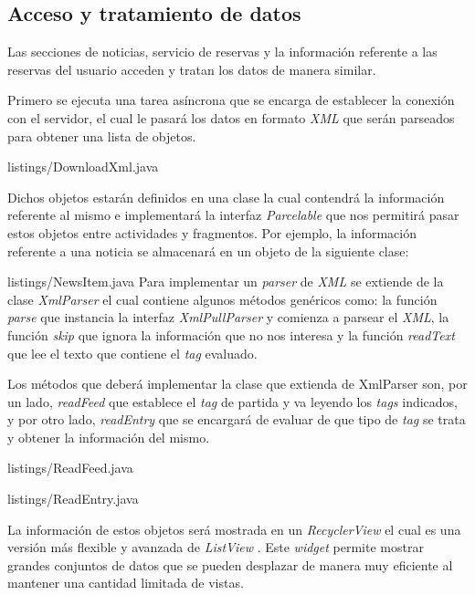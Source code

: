 \subsection{Acceso y tratamiento de datos}

Las secciones de noticias, servicio de reservas y la información referente a las reservas del usuario acceden y tratan los datos de manera similar. 

Primero se ejecuta una tarea asíncrona que se encarga de establecer la conexión con el servidor, el cual le pasará los datos en formato \textit{XML} que serán parseados para obtener una lista de objetos. 
\newpage

{listings/DownloadXml.java} %

Dichos objetos estarán definidos en una clase la cual contendrá la información referente al mismo e implementará la interfaz \textit{Parcelable} que nos permitirá pasar estos objetos entre actividades y fragmentos. Por ejemplo, la información referente a una noticia se almacenará en un objeto de la siguiente clase:
\newpage

{listings/NewsItem.java} %
\newpage
Para implementar un \textit{parser} de \textit{XML} se extiende de la clase \textit{XmlParser} el cual contiene algunos métodos genéricos como: la función \textit{parse} que instancia la interfaz \textit{XmlPullParser} \cite{URL::XmlPullParser} y comienza a parsear el \textit{XML}, la función \textit{skip} que ignora la información que no nos interesa y la función \textit{readText} que lee el texto que contiene el \textit{tag} evaluado.
\newline

Los métodos que deberá implementar la clase que extienda de XmlParser son, por un lado, \textit{readFeed} que establece el \textit{tag} de partida y va leyendo los \textit{tags} indicados, y por otro lado, \textit{readEntry} que se encargará de evaluar de que tipo de \textit{tag} se trata y obtener la información del mismo.
\newline


{listings/ReadFeed.java} %
\newpage

{listings/ReadEntry.java} %

La información de estos objetos será mostrada en un \textit{RecyclerView} \cite{URL::RecyclerView}el cual es una versión más flexible y avanzada de \textit{ListView} \cite{URL::ListView}. Este \textit{widget} \cite{URL::Widget}  permite mostrar grandes conjuntos de datos que se pueden desplazar de manera muy eficiente al mantener una cantidad limitada de vistas. 


